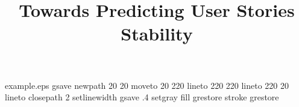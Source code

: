 %
%
%
%
%
\begin{filecontents*}{example.eps}
gsave
newpath
  20 20 moveto
  20 220 lineto
  220 220 lineto
  220 20 lineto
closepath
2 setlinewidth
gsave
  .4 setgray fill
grestore
stroke
grestore
\end{filecontents*}
%
\RequirePackage{fix-cm}
%
\documentclass[smallextended]{svjour3}       %
%
\smartqed  %
%
\usepackage{graphicx}
\usepackage{tabulary}
\usepackage{booktabs}
\usepackage{rotating}
\usepackage{color,soul}
\usepackage{amssymb}
\usepackage{hyperref}
\usepackage{float} 
\usepackage{lineno}
\linenumbers
%
%
%
\usepackage{xspace}
\newcommand{\roni}[1]{\textcolor{blue}{\textbf{[[Roni: #1]]}}}
\newcommand{\jira}{Jira\xspace}
\newcommand{\sprints}{\ensuremath{\textit{sprints}}}
\newcommand{\stability}{\ensuremath{\textit{stability}}}
%
%


\title{%
Towards Predicting User Stories Stability
}

